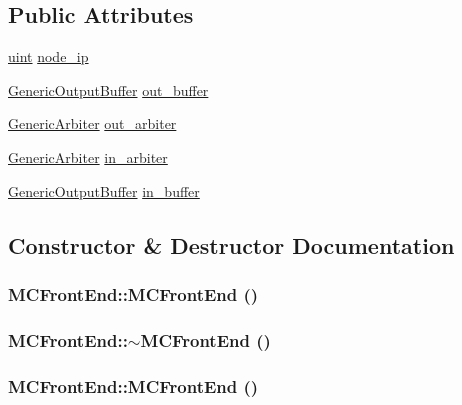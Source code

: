 \subsection*{Public Attributes}
\begin{CompactItemize}
\item 
\hyperlink{outputBuffer_8h_91ad9478d81a7aaf2593e8d9c3d06a14}{uint} \hyperlink{classMCFrontEnd_99eed4a2a554a84018c06637e863b525}{node\_\-ip}
\item 
\hyperlink{classGenericOutputBuffer}{GenericOutputBuffer} \hyperlink{classMCFrontEnd_573d6ed88ea7603b71f29c8d09995997}{out\_\-buffer}
\item 
\hyperlink{classGenericArbiter}{GenericArbiter} \hyperlink{classMCFrontEnd_8a05a43c211013595ed1e81ade65c58a}{out\_\-arbiter}
\item 
\hyperlink{classGenericArbiter}{GenericArbiter} \hyperlink{classMCFrontEnd_366abfbae09ca49371a4c5ea5548820d}{in\_\-arbiter}
\item 
\hyperlink{classGenericOutputBuffer}{GenericOutputBuffer} \hyperlink{classMCFrontEnd_7f312b013c788e1d28ac936d8808795e}{in\_\-buffer}
\end{CompactItemize}


\subsection{Constructor \& Destructor Documentation}
\hypertarget{classMCFrontEnd_26241509c8a72b46cf6ff3b843601b63}{
\subsubsection[{MCFrontEnd}]{\setlength{\rightskip}{0pt plus 5cm}MCFrontEnd::MCFrontEnd ()}}
\label{classMCFrontEnd_26241509c8a72b46cf6ff3b843601b63}


\hypertarget{classMCFrontEnd_a6661a18919e7ef025ff32c955243b5d}{
\subsubsection[{$\sim$MCFrontEnd}]{\setlength{\rightskip}{0pt plus 5cm}MCFrontEnd::$\sim$MCFrontEnd ()}}
\label{classMCFrontEnd_a6661a18919e7ef025ff32c955243b5d}


\hypertarget{classMCFrontEnd_26241509c8a72b46cf6ff3b843601b63}{
\subsubsection[{MCFrontEnd}]{\setlength{\rightskip}{0pt plus 5cm}MCFrontEnd::MCFrontEnd ()}}
\label{classMCFrontEnd_26241509c8a72b46cf6ff3b843601b63}


